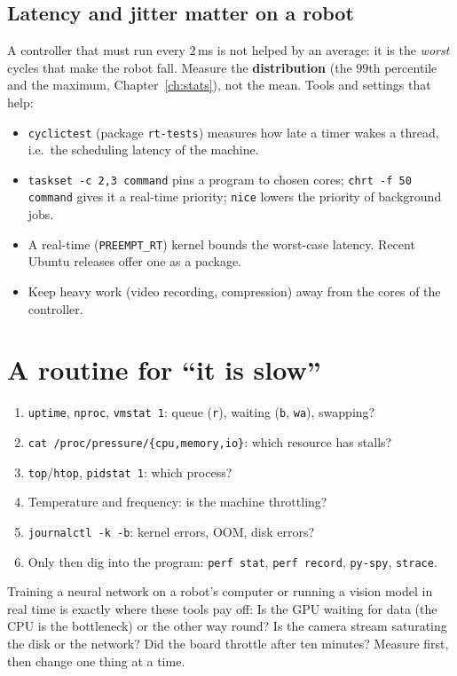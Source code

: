 \subsection*{Latency and jitter matter on a robot}
A controller that must run every $2$\,ms is not helped by an average: it is the \emph{worst} cycles that make the robot fall. Measure the \textbf{distribution} (the $99$th percentile and the maximum, Chapter~\ref{ch:stats}), not the mean. Tools and settings that help:
\begin{itemize}[nosep]
  \item \texttt{cyclictest} (package \texttt{rt-tests}) measures how late a timer wakes a thread, i.e.\ the scheduling latency of the machine.
  \item \texttt{taskset -c 2,3 command} pins a program to chosen cores; \texttt{chrt -f 50 command} gives it a real-time priority; \texttt{nice} lowers the priority of background jobs.
  \item A real-time (\texttt{PREEMPT\_RT}) kernel bounds the worst-case latency. Recent Ubuntu releases offer one as a package.
  \item Keep heavy work (video recording, compression) away from the cores of the controller.
\end{itemize}

\section*{A routine for ``it is slow''}
\begin{enumerate}[nosep]
  \item \verb|uptime|, \verb|nproc|, \verb|vmstat 1|: queue (\texttt{r}), waiting (\texttt{b}, \texttt{wa}), swapping?
  \item \verb|cat /proc/pressure/{cpu,memory,io}|: which resource has stalls?
  \item \texttt{top}/\texttt{htop}, \texttt{pidstat 1}: which process?
  \item Temperature and frequency: is the machine throttling?
  \item \verb|journalctl -k -b|: kernel errors, OOM, disk errors?
  \item Only then dig into the program: \texttt{perf stat}, \texttt{perf record}, \texttt{py-spy}, \texttt{strace}.
\end{enumerate}

\begin{aibox}
Training a neural network on a robot's computer or running a vision model in real time is exactly where these tools pay off: Is the GPU waiting for data (the CPU is the bottleneck) or the other way round? Is the camera stream saturating the disk or the network? Did the board throttle after ten minutes? Measure first, then change one thing at a time.
\end{aibox}

